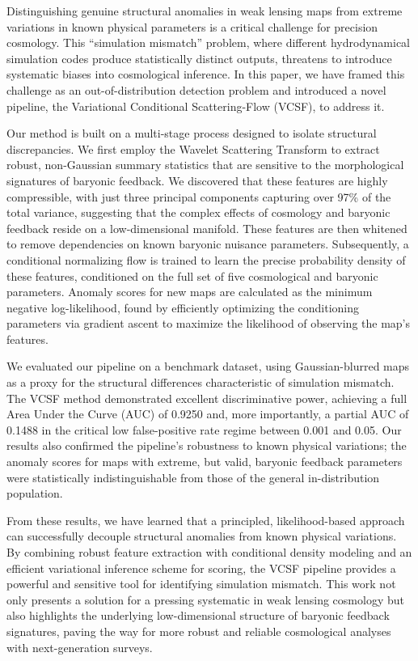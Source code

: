 \documentclass[]{article}
\begin{document}
Distinguishing genuine structural anomalies in weak lensing maps from extreme variations in known physical parameters is a critical challenge for precision cosmology. This ``simulation mismatch'' problem, where different hydrodynamical simulation codes produce statistically distinct outputs, threatens to introduce systematic biases into cosmological inference. In this paper, we have framed this challenge as an out-of-distribution detection problem and introduced a novel pipeline, the Variational Conditional Scattering-Flow (VCSF), to address it.

Our method is built on a multi-stage process designed to isolate structural discrepancies. We first employ the Wavelet Scattering Transform to extract robust, non-Gaussian summary statistics that are sensitive to the morphological signatures of baryonic feedback. We discovered that these features are highly compressible, with just three principal components capturing over 97\% of the total variance, suggesting that the complex effects of cosmology and baryonic feedback reside on a low-dimensional manifold. These features are then whitened to remove dependencies on known baryonic nuisance parameters. Subsequently, a conditional normalizing flow is trained to learn the precise probability density of these features, conditioned on the full set of five cosmological and baryonic parameters. Anomaly scores for new maps are calculated as the minimum negative log-likelihood, found by efficiently optimizing the conditioning parameters via gradient ascent to maximize the likelihood of observing the map's features.

We evaluated our pipeline on a benchmark dataset, using Gaussian-blurred maps as a proxy for the structural differences characteristic of simulation mismatch. The VCSF method demonstrated excellent discriminative power, achieving a full Area Under the Curve (AUC) of 0.9250 and, more importantly, a partial AUC of 0.1488 in the critical low false-positive rate regime between 0.001 and 0.05. Our results also confirmed the pipeline's robustness to known physical variations; the anomaly scores for maps with extreme, but valid, baryonic feedback parameters were statistically indistinguishable from those of the general in-distribution population.

From these results, we have learned that a principled, likelihood-based approach can successfully decouple structural anomalies from known physical variations. By combining robust feature extraction with conditional density modeling and an efficient variational inference scheme for scoring, the VCSF pipeline provides a powerful and sensitive tool for identifying simulation mismatch. This work not only presents a solution for a pressing systematic in weak lensing cosmology but also highlights the underlying low-dimensional structure of baryonic feedback signatures, paving the way for more robust and reliable cosmological analyses with next-generation surveys.
\end{document}
